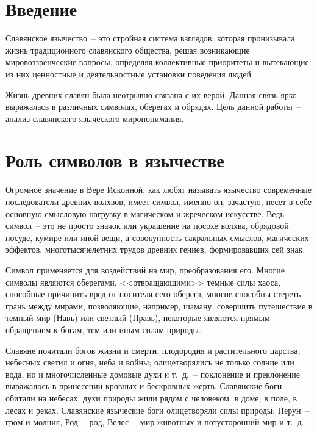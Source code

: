 \documentclass[pscyr,chapters]{hedwork}
\begin{document}
  \maketitle
  \onehalfspacing
  \tableofcontents

  \chapter*{Введение}

  Славянское язычество~-- это стройная система взглядов, которая пронизывала
  жизнь традиционного славянского общества, решая возникающие мировоззренческие
  вопросы, определяя коллективные приоритеты и вытекающие из них ценностные и
  деятельностные установки поведения людей.

  Жизнь древних славян была неотрывно связана с их верой. Данная связь ярко
  выражалась в различных символах, оберегах и обрядах.  Цель данной работы~--
  анализ славянского языческого миропонимания.

  \chapter{Роль символов в язычестве}

  Огромное значение в Вере Исконной, как любят называть язычество современные
  последователи древних волхвов, имеет символ, именно он, зачастую, несет в себе
  основную смысловую нагрузку в магическом и жреческом искусстве. Ведь символ~--
  это не просто значок или украшение на посохе волхва, обрядовой посуде, кумире
  или иной вещи, а совокупность сакральных смыслов, магических эффектов,
  многотысячелетних трудов древних гениев, формировавших сей знак.

  Символ применяется для воздействий на мир, преобразования его. Многие символы
  являются оберегами, <<отвращающими>> темные силы хаоса, способные причинить
  вред от носителя сего оберега, многие способны стереть грань между мирами,
  позволяющие, например, шаману, совершить путешествие в темный мир (Навь) или
  светлый (Правь), некоторые являются прямым обращением к богам, тем или иным
  силам природы.

  Славяне почитали богов жизни и смерти, плодородия и растительного царства,
  небесных светил и огня, неба и войны; олицетворялись не только солнце или
  вода, но и многочисленные домовые духи и т.~д.~-- поклонение и преклонение
  выражалось в принесении кровных и бескровных жертв. Славянские боги обитали
  на небесах; духи природы жили рядом с человеком: в доме, в поле, в лесах и
  реках. Славянские языческие боги олицетворяли силы природы: Перун~-- гром и
  молния, Род~-- род, Велес~-- мир животных и потусторонний мир и т.~д.
\end{document}
